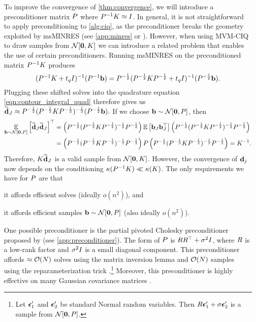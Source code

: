 To improve the convergence of \cref{thm:convergence}, we will introduce a preconditioner matrix $P$ where $P^{-1} K \approx I$.
In general, it is not straightforward to apply preconditioning to \cref{alg:ciq}, as the preconditioner breaks the geometry exploited by msMINRES (see \cref{app:minres} or \cite{aune2013iterative,jegerlehner1996krylov}).
However, when using MVM-CIQ to draw samples from $\normaldist{\bzero}{\bK}$ we can introduce a related problem that enables the use of certain preconditioners.
Running msMINRES on the preconditioned matrix $P^{-1} K$ produces
%
\[
	(P^{-1} K + t_q I)^{-1} (P^{-1} \mathbf{b})
	=
	P^{-\frac 1 2} (P^{-\frac 1 2} K P^{-\frac 1 2} + t_q I)^{-1} (P^{-\frac 1 2} \mathbf{b}).
\]
%
Plugging these shifted solves into the quadrature equation \cref{eqn:contour_integral_quad} therefore gives us
%
$
	\widetilde {\mathbf{d}}_J \approx P^{-\frac 1 2} (P^{-\frac 1 2} K P^{-\frac 1 2})^{-\frac 1 2} (P^{-\frac 1 2} \mathbf{b}).
$
%
If we choose $\bb \sim \normaldist{\bzero}{\bP}$, then
%
\begin{align*}
	\Evover{\bb \sim \normaldist{\bzero}{\bP}}{\widetilde \bd_J \widetilde \bd_J}^\top
	&=
	\left( \bP^{-\frac 1 2} (\bP^{-\frac 1 2} \bK \bP^{-\frac 1 2})^{-\frac 1 2} \bP^{-\frac 1 2} \right)
	\Ev{ \bb_J \bb_J^\top}
	\left( \bP^{-\frac 1 2} (\bP^{-\frac 1 2} \bK \bP^{-\frac 1 2})^{-\frac 1 2} \bP^{-\frac 1 2} \right)
	\\
	&=
	\left( \bP^{-\frac 1 2} (\bP^{-\frac 1 2} \bK \bP^{-\frac 1 2})^{-\frac 1 2} \bP^{-\frac 1 2} \right)
	\bP
	\left( \bP^{-\frac 1 2} (\bP^{-\frac 1 2} \bK \bP^{-\frac 1 2})^{-\frac 1 2} \bP^{-\frac 1 2} \right)
	=
	\bK^{-1}.
\end{align*}
%
Therefore, $K \widetilde {\mathbf{d}}_J$ is a valid sample from $\normaldist{\bzero}{\bK}$.
However, the convergence of $\mathbf{d}_j$ now depends on the conditioning $\kappa(P^{-1} K) \ll \kappa(K)$.
The only requirements we have for $P$ are that
\begin{enumerate*}
	\item it affords efficient solves (ideally $o(n^2)$), and
	\item it affords efficient samples $\bb \sim \normaldist{\bzero}{\bP}$ (also ideally $o(n^2)$).
\end{enumerate*}

One possible preconditioner is the partial pivoted Cholesky preconditioner proposed by \citet{gardner2018gpytorch} (see \cref{app:preconditioner}).
The form of $P$ is $R R^\top + \sigma^2 I$, where $R$ is a low-rank factor and $\sigma^2 I$ is a small diagonal component.
This preconditioner affords $\approx \bigo{N}$ solves using the matrix inversion lemma and $\bigo{N}$ samples using the reparameterization trick \cite{kingma2013auto,rezende2014stochastic}.\footnote{
	Let $\boldsymbol{\epsilon}_1'$ and $\boldsymbol{\epsilon}_2'$ be standard Normal random variables.
	Then $R \boldsymbol{\epsilon}_1' + \sigma \boldsymbol{\epsilon}_2'$ is a sample from $\normaldist{\bzero}{\bP}$.
}
Moreover, this preconditioner is highly effective on many Gaussian covariance matrices \cite{gardner2018gpytorch,wang2019exact}.





